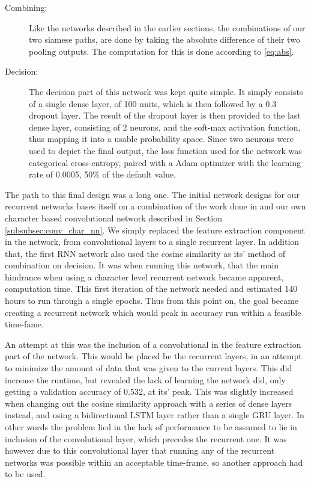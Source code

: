 \begin{description}
    \item[Combining:]

        Like the networks described in the earlier sections, the combinations
        of our two siamese paths, are done by taking the absolute difference of
        their two pooling outputs. The computation for this is done according
        to \eqref{eq:abs}.

    \item[Decision:]

        The decision part of this network was kept quite simple. It simply
        consists of a single dense layer, of 100 units, which is then followed
        by a 0.3 dropout layer. The result of the dropout layer is then provided
        to the last dense layer, consisting of 2 neurons, and the soft-max
        activation function, thus mapping it into a usable probability space.
        Since two neurons were used to depict the final output, the loss
        function used for the network was categorical cross-entropy, paired with
        a \gls{Adam} optimizer with the learning rate of 0.0005, 50\% of the
        default value.

\end{description}

The path to this final design was a long one. The initial network designs
for our recurrent networks bases itself on a combination of the work done in
\cite{qian:2018} and our own character based convolutional network described in
Section \ref{subsubsec:conv_char_nn}. We simply replaced the feature extraction
component in the network, from convolutional layers to a single recurrent layer.
In addition that, the first \gls{RNN} network also used the cosine similarity
as its' method of combination on decision. It was when running this network,
that the main hindrance when using a character level recurrent network became
apparent, computation time. This first iteration of the network needed and
estimated 140 hours to run through a single epochs. Thus from this point on, the
goal became creating a recurrent network which would peak in accuracy run within
a feasible time-fame.

An attempt at this was the inclusion of a convolutional in the feature
extraction part of the network. This would be placed be the recurrent layers,
in an attempt to minimize the amount of data that was given to the current
layers. This did increase the runtime, but revealed the lack of learning the
network did, only getting a validation accuracy of 0.532, at
its' peak. This was slightly increased when changing out the cosine similarity
approach with a series of dense layers instead, and using a bidirectional
\gls{LSTM} layer rather than a single \gls{GRU} layer. In other words the
problem lied in the lack of performance to be assumed to lie in inclusion of the
convolutional layer, which precedes the recurrent one. It was however due to
this convolutional layer that running any of the recurrent networks was possible
within an acceptable time-frame, so another approach had to be used.

